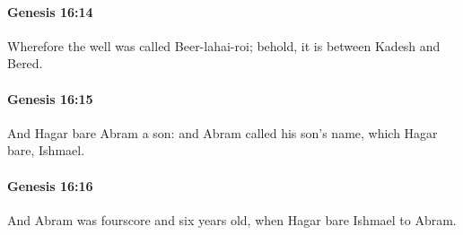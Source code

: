 		\paragraph{Genesis 16:14} %
			\label{GENESIS-16-14}

			Wherefore the well was called Beer-lahai-roi; behold, it is between Kadesh and Bered.


		\paragraph{Genesis 16:15} %
			\label{GENESIS-16-15}

			And Hagar bare Abram a son: and Abram called his son's name, which Hagar bare, Ishmael.


		\paragraph{Genesis 16:16} %
			\label{GENESIS-16-16}

			And Abram was fourscore and six years old, when Hagar bare Ishmael to Abram.


